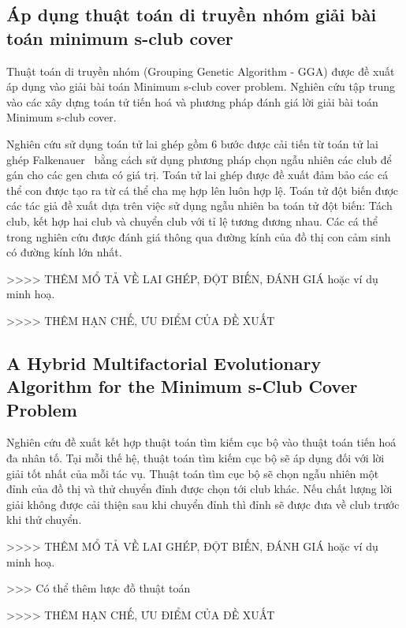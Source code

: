 \subsection{Áp dụng thuật toán di truyền nhóm giải bài toán minimum s-club cover~\cite{}}

Thuật toán di truyền nhóm (Grouping Genetic Algorithm - GGA) được đề xuất áp dụng vào giải bài toán Minimum s-club cover problem. Nghiên cứu tập trung vào các xây dựng toán tử tiến hoá và phương pháp đánh giá lời giải bài toán Minimum s-club cover.

Nghiên cứu sử dụng toán tử lai ghép gồm 6 bước được cải tiến từ toán tử lai ghép Falkenauer~\cite{falkenauer1994new} bằng cách sử dụng phương pháp chọn ngẫu nhiên các club để gán cho các gen chưa có giá trị. Toán tử lai ghép được đề xuất đảm bảo các cá thể con được tạo ra từ cá thể cha mẹ hợp lên luôn hợp lệ. Toán tử đột biến được các tác giả đề xuất dựa trên việc sử dụng ngẫu nhiên ba toán tử đột biến: Tách club, kết hợp hai club và chuyển club với tỉ lệ tương đương nhau. Các cá thể trong nghiên cứu được đánh giá thông qua đường kính của đồ thị con cảm sinh có đường kính lớn nhất.

>>>> THÊM MỔ TẢ VỀ LAI GHÉP, ĐỘT BIẾN, ĐÁNH GIÁ hoặc ví dụ minh hoạ.

>>>> THÊM HẠN CHẾ, ƯU ĐIỂM CỦA ĐỀ XUẤT




\subsection{A Hybrid Multifactorial Evolutionary Algorithm for the Minimum s-Club Cover Problem~\cite{thanh2024hybrid}}

Nghiên cứu đề xuất kết hợp thuật toán tìm kiếm cục bộ vào thuật toán tiến hoá đa nhân tố. Tại mỗi thế hệ, thuật toán tìm kiếm cục bộ sẽ áp dụng đối với lời giải tốt nhất của mỗi tác vụ. Thuật toán tìm cục bộ sẽ chọn ngẫu nhiên một đỉnh của đồ thị và thử chuyển đỉnh được chọn tới club khác. Nếu chất lượng lời giải không được cải thiện sau khi chuyển đỉnh thì đỉnh sẽ được đưa về club trước khi thử chuyển.


>>>> THÊM MỔ TẢ VỀ LAI GHÉP, ĐỘT BIẾN, ĐÁNH GIÁ hoặc ví dụ minh hoạ.

>>> Có thể thêm lược đồ thuật toán

>>>> THÊM HẠN CHẾ, ƯU ĐIỂM CỦA ĐỀ XUẤT


